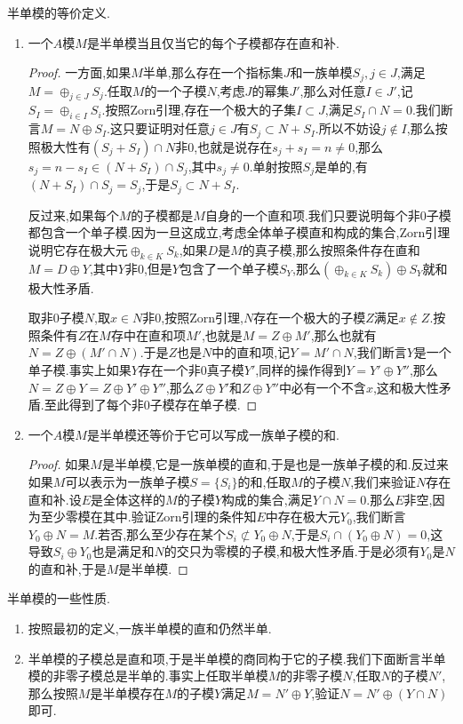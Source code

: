 半单模的等价定义.
\begin{enumerate}
	\item 一个$A$模$M$是半单模当且仅当它的每个子模都存在直和补.
	\begin{proof}
		
		一方面,如果$M$半单,那么存在一个指标集$J$和一族单模$S_j,j\in J$,满足$M=\oplus_{j\in J}S_j$.任取$M$的一个子模$N$,考虑$J$的幂集$J'$,那么对任意$I\in J'$,记$S_I=\oplus_{i\in I}S_i$.按照Zorn引理,存在一个极大的子集$I\subset J$,满足$S_I\cap N=0$.我们断言$M=N\oplus S_I$.这只要证明对任意$j\in J$有$S_j\subset N+S_I$.所以不妨设$j\not\in I$,那么按照极大性有$(S_j+S_I)\cap N$非0,也就是说存在$s_j+s_I=n\not=0$,那么$s_j=n-s_I\in (N+S_I)\cap S_j$,其中$s_j\not=0$.单射按照$S_j$是单的,有$(N+S_I)\cap S_j=S_j$,于是$S_j\subset N+S_I$.
		
		反过来,如果每个$M$的子模都是$M$自身的一个直和项.我们只要说明每个非0子模都包含一个单子模.因为一旦这成立,考虑全体单子模直和构成的集合,Zorn引理说明它存在极大元$\oplus_{k\in K}S_k$,如果$D$是$M$的真子模,那么按照条件存在直和$M=D\oplus Y$,其中$Y$非0,但是$Y$包含了一个单子模$S_Y$,那么$\left(\oplus_{k\in K}S_k\right)\oplus S_Y$就和极大性矛盾.
		
		取非0子模$N$,取$x\in N$非0,按照Zorn引理,$N$存在一个极大的子模$Z$满足$x\not\in Z$.按照条件有$Z$在$M$存中在直和项$M'$,也就是$M=Z\oplus M'$,那么也就有$N=Z\oplus(M'\cap N)$.于是$Z$也是$N$中的直和项,记$Y=M'\cap N$,我们断言$Y$是一个单子模.事实上如果$Y$存在一个非0真子模$Y'$,同样的操作得到$Y=Y'\oplus Y''$,那么$N=Z\oplus Y=Z\oplus Y'\oplus Y''$,那么$Z\oplus Y'$和$Z\oplus Y''$中必有一个不含$x$,这和极大性矛盾.至此得到了每个非0子模存在单子模.
	\end{proof}
	\item 一个$A$模$M$是半单模还等价于它可以写成一族单子模的和.
	\begin{proof}
		
		如果$M$是半单模,它是一族单模的直和,于是也是一族单子模的和.反过来如果$M$可以表示为一族单子模$S=\{S_i\}$的和,任取$M$的子模$N$,我们来验证$N$存在直和补.设$E$是全体这样的$M$的子模$Y$构成的集合,满足$Y\cap N=0$.那么$E$非空,因为至少零模在其中.验证Zorn引理的条件知$E$中存在极大元$Y_0$,我们断言$Y_0\oplus N=M$.若否,那么至少存在某个$S_i\not\subset Y_0\oplus N$,于是$S_i\cap(Y_0\oplus N)=0$,这导致$S_i\oplus Y_0$也是满足和$N$的交只为零模的子模,和极大性矛盾.于是必须有$Y_0$是$N$的直和补,于是$M$是半单模.
	\end{proof}
\end{enumerate}

半单模的一些性质.
\begin{enumerate}
	\item 按照最初的定义,一族半单模的直和仍然半单.
	\item 半单模的子模总是直和项,于是半单模的商同构于它的子模.我们下面断言半单模的非零子模总是半单的.事实上任取半单模$M$的非零子模$N$,任取$N$的子模$N'$,那么按照$M$是半单模存在$M$的子模$Y$满足$M=N'\oplus Y$,验证$N=N'\oplus(Y\cap N)$即可.
\end{enumerate}

